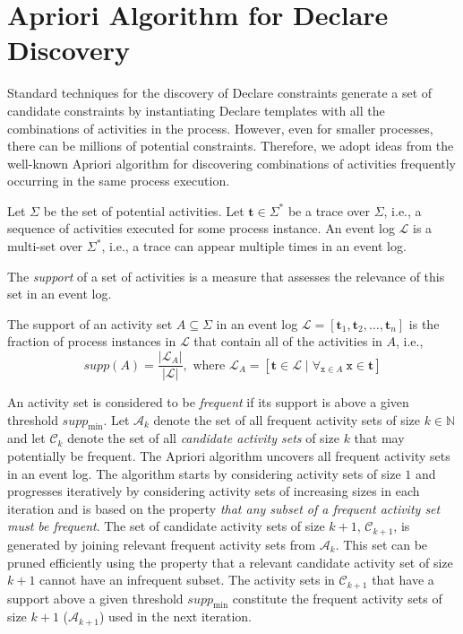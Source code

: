 \section{Apriori Algorithm for Declare Discovery}\label{sec:Apriori}

Standard techniques for the discovery of Declare constraints generate a set of candidate constraints by instantiating Declare templates with all the combinations of activities in the process. However, even for smaller processes, there can be millions of potential constraints.
Therefore, we adopt ideas from the well-known Apriori algorithm \cite{agrawalApriori}
for discovering combinations of activities frequently occurring in the same process execution.

Let $\Sigma$ be the set of potential activities. Let $\textbf{t} \in \Sigma^*$ be a trace over $\Sigma$, i.e., a sequence of activities executed for some process instance.
An event log $\mathcal{L}$ is a multi-set over $\Sigma^*$, i.e., a trace can appear multiple times in an event log.

The {\em support} of a set of activities is a measure that assesses the relevance of this set in an event log.
\begin{definition}
The support of an activity set $A \subseteq \Sigma$ in an event log $\mathcal{L} = [\textbf{t}_1, \textbf{t}_2, \dots,  \textbf{t}_n]$
is the fraction of process instances in $\mathcal{L}$ that contain all of the activities in $A$, i.e.,\\
\begin{equation*}
\mathit{supp}(A) = \frac{\vert\mathcal{L}_{A}\vert}{\vert \mathcal{L}\vert}, \text{ where }\mathcal{L}_{A} = [\textbf{t} \in \mathcal{L} \mid \forall_{\texttt{x} \in A} \ \texttt{x} \in \textbf{t}]
\end{equation*}
\end{definition}
An activity set is considered to be {\em frequent} if its support is above a given threshold $\mathit{supp}_{\min}$. Let $\mathcal{A}_k$ denote the set of all frequent activity sets of size $k \in \mathbb{N}$ and let $\mathcal{C}_k$ denote the set of all {\em candidate activity sets} of size $k$ that may potentially be frequent. The Apriori algorithm uncovers all frequent activity sets in an event log. The algorithm starts by considering activity sets of size $1$ and progresses iteratively by considering activity sets of increasing sizes in each iteration and is based on the property {\em that any subset of a frequent activity set must be frequent}. The set of candidate activity sets of size $k+1$, $\mathcal{C}_{k+1}$, is generated by joining relevant frequent activity sets from $\mathcal{A}_k$. This set can be pruned efficiently using the property that a relevant candidate activity set of size $k+1$ cannot have an infrequent subset.
The activity sets in $\mathcal{C}_{k+1}$ that have a support above a given threshold $\mathit{supp}_{\min}$
constitute the frequent activity sets of size $k+1$ ($\mathcal{A}_{k+1}$) used in the next iteration.

